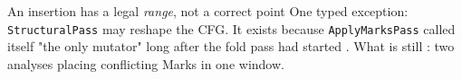 \begin{frame}{An insertion has a legal \emph{range}, not a correct point}
\vspace{3pt}
{\scriptsize One typed exception: \texttt{StructuralPass} may reshape the CFG. It exists because
\texttt{ApplyMarksPass} called itself "the only mutator" long after the fold pass had started
. What is still : two analyses placing conflicting Marks in one window.}
\end{frame}
